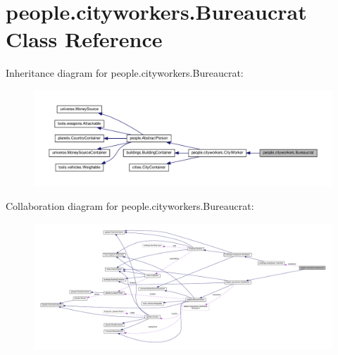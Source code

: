 \hypertarget{classpeople_1_1cityworkers_1_1_bureaucrat}{}\section{people.\+cityworkers.\+Bureaucrat Class Reference}
\label{classpeople_1_1cityworkers_1_1_bureaucrat}


Inheritance diagram for people.\+cityworkers.\+Bureaucrat\+:
\nopagebreak
\begin{figure}[H]
\begin{center}
\leavevmode
\includegraphics[width=350pt]{classpeople_1_1cityworkers_1_1_bureaucrat__inherit__graph}
\end{center}
\end{figure}


Collaboration diagram for people.\+cityworkers.\+Bureaucrat\+:
\nopagebreak
\begin{figure}[H]
\begin{center}
\leavevmode
\includegraphics[width=350pt]{classpeople_1_1cityworkers_1_1_bureaucrat__coll__graph}
\end{center}
\end{figure}
